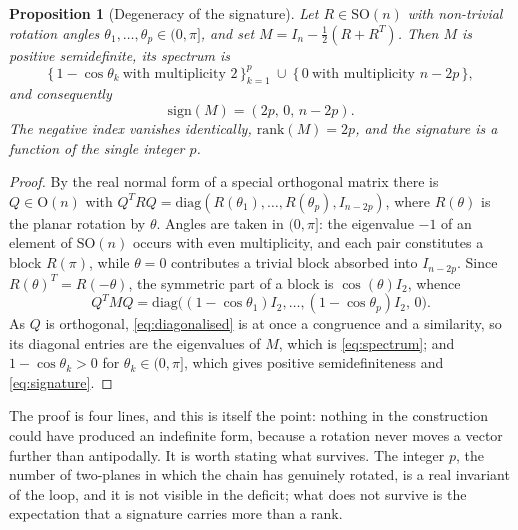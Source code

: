 \documentclass[11pt,a4paper]{article}
\theoremstyle{plain}
\newtheorem{proposition}[theorem]{Proposition}
\theoremstyle{definition}
\numberwithin{equation}{section}
\newcommand{\SO}{\mathrm{SO}}
\newcommand{\Ort}{\mathrm{O}}
\newcommand{\sgn}{\mathrm{sign}}
\begin{document}
\begin{proposition}[Degeneracy of the signature]\label{prop:sig}
Let $R \in \SO(n)$ with non-trivial rotation angles
$\theta_1,\dots,\theta_p \in (0,\pi]$, and set
$M = I_n - \tfrac12(R+R^T)$. Then $M$ is positive semidefinite, its
spectrum is
\begin{equation}\label{eq:spectrum}
\bigl\{\, 1 - \cos\theta_k \ \text{with multiplicity } 2 \,\bigr\}_{k=1}^{p}
\ \cup\ \bigl\{\, 0 \ \text{with multiplicity } n-2p \,\bigr\},
\end{equation}
and consequently
\begin{equation}\label{eq:signature}
\sgn(M) = (2p,\, 0,\, n-2p).
\end{equation}
The negative index vanishes identically, $\mathrm{rank}(M) = 2p$, and
the signature is a function of the single integer $p$.
\end{proposition}

\begin{proof}
By the real normal form of a special orthogonal matrix there is
$Q \in \Ort(n)$ with
$Q^T R Q = \mathrm{diag}(R(\theta_1),\dots,R(\theta_p),I_{n-2p})$, where
$R(\theta)$ is the planar rotation by $\theta$. Angles are taken in
$(0,\pi]$: the eigenvalue $-1$ of an element of $\SO(n)$ occurs with
even multiplicity, and each pair constitutes a block $R(\pi)$, while
$\theta = 0$ contributes a trivial block absorbed into $I_{n-2p}$. Since
$R(\theta)^T = R(-\theta)$, the symmetric part of a block is
$\cos(\theta)I_2$, whence
\begin{equation}\label{eq:diagonalised}
Q^T M Q = \mathrm{diag}\bigl((1-\cos\theta_1)I_2,\dots,
(1-\cos\theta_p)I_2,\,0\bigr).
\end{equation}
As $Q$ is orthogonal, \eqref{eq:diagonalised} is at once a congruence
and a similarity, so its diagonal entries are the eigenvalues of $M$,
which is \eqref{eq:spectrum}; and $1-\cos\theta_k > 0$ for
$\theta_k \in (0,\pi]$, which gives positive semidefiniteness and
\eqref{eq:signature}.
\end{proof}

The proof is four lines, and this is itself the point: nothing in the
construction could have produced an indefinite form, because a rotation
never moves a vector further than antipodally. It is worth stating what
survives. The integer $p$, the number of two-planes in which the chain
has genuinely rotated, is a real invariant of the loop, and it is not
visible in the deficit; what does not survive is the expectation that a
signature carries more than a rank.
\end{document}
